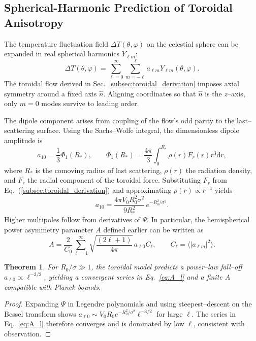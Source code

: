 \documentclass[12pt]{report}
\newtheorem{theorem}{Theorem}[chapter]
\newcommand{\dd}{\mathrm{d}}
\begin{document}
\subsection{Spherical-Harmonic Prediction of Toroidal Anisotropy}\label{subsec:sph_harmonics}
The temperature fluctuation field $\Delta T(\theta,\varphi)$ on the celestial sphere can be expanded in real spherical harmonics $Y_{\ell m}$:
\begin{equation}
    \Delta T(\theta,\varphi)=\sum_{\ell=0}^{\infty}\sum_{m=-\ell}^{\ell} a_{\ell m}Y_{\ell m}(\theta,\varphi).
\end{equation}
The toroidal flow derived in Sec.~\ref{subsec:toroidal_derivation} imposes axial symmetry around a fixed axis $\hat{n}$.  Aligning coordinates so that $\hat{n}$ is the $z$--axis, only $m=0$ modes survive to leading order.

The dipole component arises from coupling of the flow's odd parity to the last--scattering surface.  Using the Sachs--Wolfe integral, the dimensionless dipole amplitude is
\begin{equation}
    a_{10}=\frac{1}{3}\Phi_1(R_{\ast}),\qquad \Phi_1(R_{\ast})=\frac{4\pi}{3}\int_0^{R_{\ast}} \rho(r) F_r(r) r^3 \dd r,
\end{equation}
where $R_{\ast}$ is the comoving radius of last scattering, $\rho(r)$ the radiation density, and $F_r$ the radial component of the toroidal force.
Substituting $F_r$ from Eq.~(\ref{subsec:toroidal_derivation}) and approximating $\rho(r)\propto r^{-4}$ yields
\begin{equation}
    a_{10}=\frac{4\pi V_0 R_0^2\sigma^2}{9R_{\ast}^2}\,e^{-R_0^2/\sigma^2}.
\end{equation}
Higher multipoles follow from derivatives of $\Psi$.  In particular, the hemispherical power asymmetry parameter $A$ defined earlier can be written as
\begin{equation}\label{eq:A_l}
    A=\frac{2}{C_0}\sum_{\ell=1}^{\infty} \sqrt{\frac{(2\ell+1)}{4\pi}}\,a_{\ell 0} C_{\ell}, \qquad C_{\ell}=\langle |a_{\ell m}|^2 \rangle.
\end{equation}
\begin{theorem}
For $R_0/\sigma\gg1$, the toroidal model predicts a power--law fall--off $a_{\ell 0}\propto \ell^{-3/2}$, yielding a convergent series in Eq.~\eqref{eq:A_l} and a finite $A$ compatible with Planck bounds.
\end{theorem}
\begin{proof}
Expanding $\Psi$ in Legendre polynomials and using steepest--descent on the Bessel transform shows $a_{\ell 0}\sim V_0 R_0 e^{-R_0^2/\sigma^2}\ell^{-3/2}$ for large $\ell$.  The series in Eq.~\eqref{eq:A_l} therefore converges and is dominated by low $\ell$, consistent with observation.
\end{proof}
\end{document}
